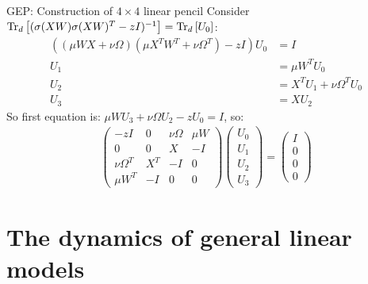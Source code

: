 \documentclass[10pt]{beamer}
\begin{document}
\begin{frame}{GEP: Construction of $4\times 4$ linear pencil}
  Consider $\traceLim[d]{(\sigma(XW) \sigma(XW)^{T} - zI)^{-1}} = \traceLim[d]{U_0}$:
  \begin{align*}
    ((\mu W X + \nu \Omega) (\mu X^T W^T + \nu \Omega^T) - z I) U_0 & = I\\
    U_1 & = \mu W^T U_0 \\
    U_2 & = X^T U_1 + \nu \Omega^T U_0\\
    U_3 & = X U_2
  \end{align*}
  So first equation is: $ \mu W U_3 + \nu \Omega U_2 - z U_0 = I$, so:
  \begin{align*}
    \begin{pmatrix}
      -z I & 0 & \nu \Omega & \mu W\\
      0 & 0 & X & -I\\
      \nu \Omega^T & X^T & -I & 0\\
      \mu W^T & -I & 0 & 0
    \end{pmatrix}
    \begin{pmatrix}
      U_0\\
      U_1\\
      U_2\\
      U_3
    \end{pmatrix}
    = 
    \begin{pmatrix}
      I\\
      0\\
      0\\
      0
    \end{pmatrix}
  \end{align*}

\end{frame}

\section{The dynamics of general linear models}
\end{document}
